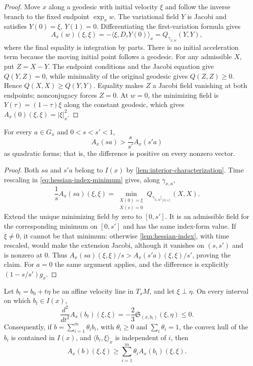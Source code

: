 \begin{proof}
Move $x$ along a geodesic with initial velocity $\xi$ and follow the
inverse branch to the fixed endpoint $\exp_x w$.  The variational
field $Y$ is Jacobi and satisfies $Y(0)=\xi$, $Y(1)=0$.
Differentiating the first-variation formula gives
\[
 A_x(w)(\xi,\xi)=-\langle\xi,D_\tau Y(0)\rangle_x
                 =Q_{\gamma_{x,w}}(Y,Y),
\]
where the final equality is integration by parts.  There is no initial
acceleration term because the moving initial point follows a geodesic.
For any admissible $X$, put $Z=X-Y$.  The endpoint conditions and
the Jacobi equation give $Q(Y,Z)=0$, while minimality of the original
geodesic gives $Q(Z,Z)\geq0$.  Hence $Q(X,X)\geq Q(Y,Y)$.
Equality makes $Z$ a Jacobi field vanishing at both endpoints;
nonconjugacy forces $Z=0$.  At $w=0$, the minimizing field is
$Y(\tau)=(1-\tau)\xi$ along the constant geodesic, which gives
$A_x(0)(\xi,\xi)=|\xi|_x^2$.
\end{proof}

\begin{lemma}
\label{lem:radial-comparison}
For every $a\in G_x$ and $0<s<s'<1$,
\begin{equation}
 A_x(sa)>\frac{s}{s'}A_x(s'a)
 \label{eq:radial-comparison}
\end{equation}
as quadratic forms; that is, the difference is positive on every
nonzero vector.
\end{lemma}

\begin{proof}
Both $sa$ and $s'a$ belong to $I(x)$ by
\cref{lem:interior-characterization}.  Time rescaling in
\eqref{eq:hessian-index-minimum} gives, along $\gamma_{x,a}$,
\[
 \frac1s A_x(sa)(\xi,\xi)
 =\min_{\substack{X(0)=\xi\\X(s)=0}}Q_{\gamma_{x,a}|_{[0,s]}}(X,X).
\]
Extend the unique minimizing field by zero to $[0,s']$.
It is an admissible field for the corresponding minimum on $[0,s']$
and has the same index-form value.  If $\xi\ne0$, it cannot be that
minimum: otherwise \cref{lem:hessian-index}, with time rescaled,
would make the extension Jacobi, although it vanishes on $(s,s')$
and is nonzero at $0$.  Thus
$A_x(sa)(\xi,\xi)/s>A_x(s'a)(\xi,\xi)/s'$, proving the claim.
For $a=0$ the same argument applies, and the difference is explicitly
$(1-s/s')g_x$.
\end{proof}

\begin{lemma}
\label{lem:transverse-concavity}
Let $b_t=b_0+t\eta$ be an affine velocity line in $T_xM$, and let
$\xi\perp\eta$.  On every interval on which $b_t\in I(x)$,
\begin{equation}
 \frac{d^2}{dt^2}A_x(b_t)(\xi,\xi)
 =-\frac23\mathfrak S_{(x,b_t)}(\xi,\eta)\leq0.
 \label{eq:transverse-concavity}
\end{equation}
Consequently, if $b=\sum_{i=1}^m\theta_i b_i$, with
$\theta_i\geq0$ and $\sum_i\theta_i=1$, the convex hull of the
$b_i$ is contained in $I(x)$, and $\langle b_i,\xi\rangle_x$
is independent of $i$, then
\[
 A_x(b)(\xi,\xi)\geq\sum_{i=1}^m\theta_iA_x(b_i)(\xi,\xi).
\]
\end{lemma}


